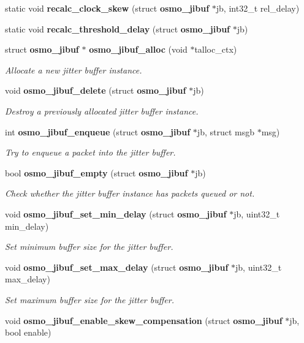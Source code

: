 \begin{DoxyCompactItemize}
static void {\bfseries recalc\+\_\+clock\+\_\+skew} (struct {\bf osmo\+\_\+jibuf} $\ast$jb, int32\+\_\+t rel\+\_\+delay)
\item 
static void {\bfseries recalc\+\_\+threshold\+\_\+delay} (struct {\bf osmo\+\_\+jibuf} $\ast$jb)
\item 
struct {\bf osmo\+\_\+jibuf} $\ast$ {\bf osmo\+\_\+jibuf\+\_\+alloc} (void $\ast$talloc\+\_\+ctx)
\begin{DoxyCompactList}\small\item\em Allocate a new jitter buffer instance. \end{DoxyCompactList}\item 
void {\bf osmo\+\_\+jibuf\+\_\+delete} (struct {\bf osmo\+\_\+jibuf} $\ast$jb)
\begin{DoxyCompactList}\small\item\em Destroy a previously allocated jitter buffer instance. \end{DoxyCompactList}\item 
int {\bf osmo\+\_\+jibuf\+\_\+enqueue} (struct {\bf osmo\+\_\+jibuf} $\ast$jb, struct msgb $\ast$msg)
\begin{DoxyCompactList}\small\item\em Try to enqueue a packet into the jitter buffer. \end{DoxyCompactList}\item 
bool {\bf osmo\+\_\+jibuf\+\_\+empty} (struct {\bf osmo\+\_\+jibuf} $\ast$jb)
\begin{DoxyCompactList}\small\item\em Check whether the jitter buffer instance has packets queued or not. \end{DoxyCompactList}\item 
void {\bf osmo\+\_\+jibuf\+\_\+set\+\_\+min\+\_\+delay} (struct {\bf osmo\+\_\+jibuf} $\ast$jb, uint32\+\_\+t min\+\_\+delay)
\begin{DoxyCompactList}\small\item\em Set minimum buffer size for the jitter buffer. \end{DoxyCompactList}\item 
void {\bf osmo\+\_\+jibuf\+\_\+set\+\_\+max\+\_\+delay} (struct {\bf osmo\+\_\+jibuf} $\ast$jb, uint32\+\_\+t max\+\_\+delay)
\begin{DoxyCompactList}\small\item\em Set maximum buffer size for the jitter buffer. \end{DoxyCompactList}\item 
void {\bf osmo\+\_\+jibuf\+\_\+enable\+\_\+skew\+\_\+compensation} (struct {\bf osmo\+\_\+jibuf} $\ast$jb, bool enable)

\end{DoxyCompactItemize}

